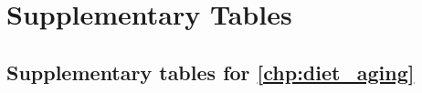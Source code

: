 \chapter{Supplementary Tables}
\label{chp:app_tables}

\clearpage


    
\section[\autoref{chp:diet_aging}]{Supplementary tables for \autoref{chp:diet_aging}}


